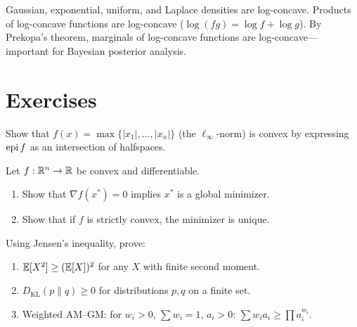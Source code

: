 \documentclass[11pt,a4paper]{article}
\begin{document}
\begin{example}
\label{ex:log-concave-densities}
Gaussian, exponential, uniform, and Laplace densities are log-concave.
Products of log-concave functions are log-concave ($\log(fg) = \log f +
\log g$).  By Prekopa's theorem, marginals of log-concave functions are
log-concave---important for Bayesian posterior analysis.
\end{example}


\section{Exercises}

\begin{exercise}
\label{exer:epigraph}
Show that $f(x) = \max\{|x_1|, \ldots, |x_n|\}$ (the $\ell_\infty$-norm) is
convex by expressing $\operatorname{epi} f$ as an intersection of halfspaces.
\end{exercise}

\begin{exercise}
\label{exer:first-order}
Let $f : \mathbb{R}^n \to \mathbb{R}$ be convex and differentiable.
\begin{enumerate}[label=(\alph*)]
  \item Show that $\nabla f(x^*) = 0$ implies $x^*$ is a global minimizer.
  \item Show that if $f$ is strictly convex, the minimizer is unique.
\end{enumerate}
\end{exercise}

\begin{exercise}
\label{exer:jensen}
Using Jensen's inequality, prove:
\begin{enumerate}[label=(\alph*)]
  \item $\mathbb{E}[X^2] \ge (\mathbb{E}[X])^2$ for any $X$ with finite second moment.
  \item $D_{\mathrm{KL}}(p \| q) \ge 0$ for distributions $p, q$ on a finite
        set.
  \item Weighted AM--GM: for $w_i > 0$, $\sum w_i = 1$, $a_i > 0$:
        $\sum w_i a_i \ge \prod a_i^{w_i}$.
\end{enumerate}
\end{exercise}
\end{document}
